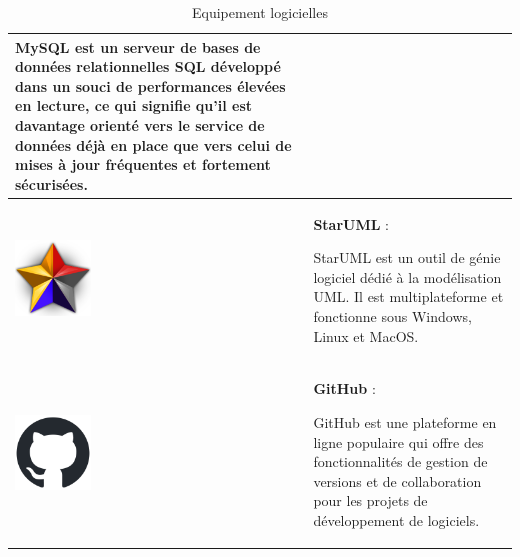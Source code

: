 \documentclass{article}
\begin{document}
\begin{table}[h!]
\begin{tabular}{|m{2cm}|m{12cm}|}
                        MySQL est un serveur de bases de données relationnelles SQL développé dans un souci de performances élevées en lecture, ce qui signifie qu'il est davantage orienté vers le service de données déjà en place que vers celui de mises à jour fréquentes et fortement sécurisées. \\
                        \hline
                        \includegraphics[width=2cm]{assets/logos/staruml-icon.png} &
                        \textbf{StarUML} :
                        
                        StarUML est un outil de génie logiciel dédié à la modélisation UML. Il est multiplateforme et fonctionne sous Windows, Linux et MacOS. \\
                        \hline
                        \includegraphics[width=2cm]{assets/logos/github-mark.png} &
                        \textbf{GitHub} :
                        
                        GitHub est une plateforme en ligne populaire qui offre des fonctionnalités de gestion de versions et de collaboration pour les projets de développement de logiciels. \\
                        \hline
                    \end{tabular}
                    \caption{Equipement logicielles}
                \end{table}
            \FloatBarrier
\end{document}

